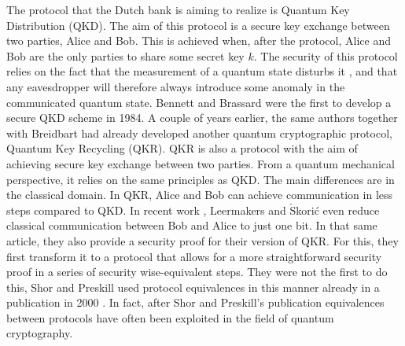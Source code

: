 \documentclass[]{article}
\begin{document}
The protocol that the Dutch bank is aiming to realize is Quantum Key Distribution (QKD). The aim of this protocol is a secure key exchange between two parties, Alice and Bob. This is achieved when, after the protocol, Alice and Bob are the only parties to share some secret key $k$. The security of this protocol relies on the fact that the measurement of a quantum state disturbs it \cite{Lindblad1999}, and that any eavesdropper will therefore always introduce some anomaly in the communicated quantum state. Bennett and Brassard were the first to develop a secure QKD scheme in 1984. A couple of years earlier, the same authors together with Breidbart had already developed another quantum cryptographic protocol, Quantum Key Recycling (QKR). QKR is also a protocol with the aim of achieving secure key exchange between two parties. From a quantum mechanical perspective, it relies on the same principles as QKD. The main differences are in the classical domain. In QKR, Alice and Bob can achieve communication in less steps compared to QKD. In recent work \cite{cryptoeprint:2019:875}, Leermakers and $\check{\textrm{S}}$korić even reduce classical communication between Bob and Alice to just one bit. In that same article, they also provide a security proof for their version of QKR. For this, they first transform it to a protocol that allows for a more straightforward security proof in a series of security wise-equivalent steps. They were not the first to do this, Shor and Preskill used protocol equivalences in this manner already in a publication in 2000 \cite{Shor2000}. In fact, after Shor and Preskill's publication equivalences between protocols have often been exploited in the field of quantum cryptography.

\end{document}
